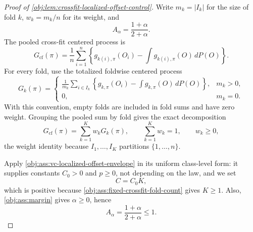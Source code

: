 \begin{proof}[Proof of \cref{obj:lem:crossfit-localized-offset-control}]
Write \(m_k=|I_k|\) for the size of fold \(k\), \(w_k=m_k/n\) for its weight, and
\[
A_\alpha=\frac{1+\alpha}{2+\alpha}.
\]
The pooled cross-fit centered process is
\[
G_{\mathrm{cf}}(\pi)
=
\frac1n\sum_{i=1}^n\left\{g_{k(i),\pi}(O_i)-\int g_{k(i),\pi}(O)\,dP(O)\right\}.
\]
For every fold, use the totalized foldwise centered process
\[
G_k(\pi)=
\begin{cases}
\displaystyle
\frac1{m_k}\sum_{i\in I_k}\left\{g_{k,\pi}(O_i)-\int g_{k,\pi}(O)\,dP(O)\right\}, & m_k>0,\\[1.2ex]
0, & m_k=0.
\end{cases}
\]
With this convention, empty folds are included in fold sums and have zero weight. Grouping the pooled sum by fold gives the exact decomposition
\[
G_{\mathrm{cf}}(\pi)=\sum_{k=1}^K w_kG_k(\pi),
\qquad
\sum_{k=1}^K w_k=1,
\qquad
w_k\ge0,
\]
the weight identity because \(I_1,\ldots,I_K\) partitions \(\{1,\ldots,n\}\). %

Apply \cref{obj:ass:vc-localized-offset-envelope} in its uniform class-level form: it supplies constants \(C_0>0\) and \(p\ge0\), not depending on the law, and we set
\[
C=C_0K,
\]
which is positive because \cref{obj:ass:fixed-crossfit-fold-count} gives \(K\ge1\). %
Also, \cref{obj:ass:margin} gives \(\alpha\ge0\), hence
\[
A_\alpha=\frac{1+\alpha}{2+\alpha}\le1 .
\]


\end{proof}

